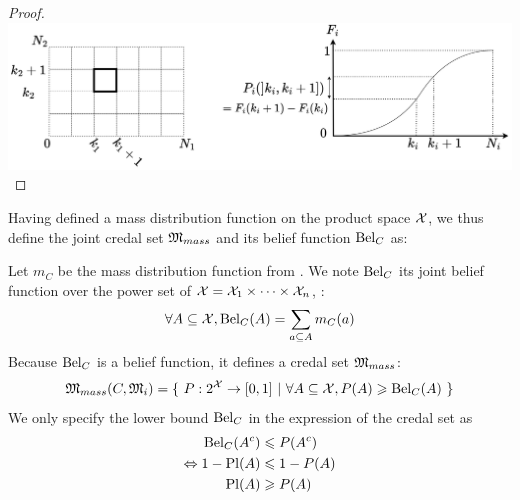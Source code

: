 \begin{proof}
{\centering\includegraphics[width=\linewidth]{Images/Chap_3/Demo_CDF.png}\label{fig:Demo_CDF}}\par
\end{proof}

Having defined a mass distribution function on the product space $\mathcal{X}$, we thus define the joint credal set $\mathfrak{M}_{mass}$ and its belief function $\mathrm{Bel}_C$ as:
\begin{definition}\label{def:cumulative_masses_credal_set}
    Let $m_C$ be the mass distribution function from . We note $\mathrm{Bel}_C$ its joint belief function over the power set of $\mathcal{X}=\mathcal{X}_1\times\dots\times \mathcal{X}_n$, \ie:
    \begin{align}
        \forall A\subseteq\mathcal{X}, \mathrm{Bel}_C(A)=\sum_{a\subseteq A}m_C(a)\label{eq:joint_belief}
    \end{align}
    Because $\mathrm{Bel}_C$ is a belief function, it defines a credal set $\mathfrak{M}_{mass}$:
    \begin{eqnarray}
        \mathfrak{M}_{mass}(C,\mathfrak{M}_i) = \{~P:2^{\mathcal{X}}\rightarrow [0,1] ~|~ \forall A\subseteq\mathcal{X}, P(A)\geqslant \mathrm{Bel}_C(A)~\}\label{eq:credal_set_mass}
    \end{eqnarray}
    We only specify the lower bound $\mathrm{Bel}_C$ in the expression of the credal set as 
    \begin{align*}
        \mathrm{Bel}_C(A^c)&\leqslant P(A^c)\\
        \Leftrightarrow 1-\mathrm{Pl}(A) &\leqslant 1-P(A)\\
        \mathrm{Pl}(A) &\geqslant P(A)
    \end{align*}
\end{definition}


